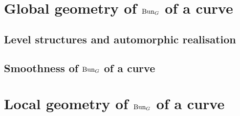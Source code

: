     \section{Global geometry of \texorpdfstring{$\mathrm{Bun}_G$}{} of a curve}
        \subsection{Level structures and automorphic realisation}

        \subsection{Smoothness of \texorpdfstring{$\mathrm{Bun}_G$}{} of a curve}

    \section{Local geometry of \texorpdfstring{$\mathrm{Bun}_G$}{} of a curve}
    
    \printbibliography

